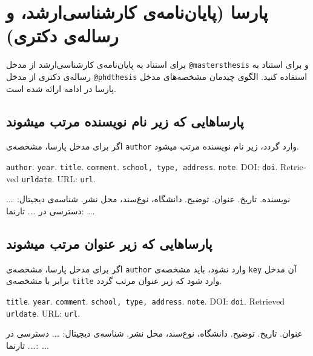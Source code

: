 \documentclass[a4paper,11pt]{article}
\begin{document}
\section{پارسا (پایان‌نامه‌ی کارشناسی‌ارشد، و رساله‌ی دکتری)}
برای استناد به پایان‌نامه‌ی کارشناسی‌ارشد از مدخل \verb|@mastersthesis| و برای استناد به رساله‌ی دکتری از مدخل \verb|@phdthesis| استفاده کنید. الگوی چیدمان مشخصه‌های مدخل پارسا در ادامه ارائه شده است.





\subsection{پارساهایی که زیر نام نویسنده مرتب میشوند}
اگر برای مدخل پارسا، مشخصه‌ی \verb|author| وارد گردد، زیر نام نویسنده مرتب میشود.

\begin{itemize}[nosep]
\begin{latin}
\item[] []
{\tt author}. {\tt year}. {\tt title}. {\tt comment}. {\tt school, type, address}. {\tt note}. DOI: {\tt doi}. Retrieved {\tt urldate}. URL: {\tt url}. 
\end{latin}

\item[] []
{\persianttfamily نویسنده}. {\persianttfamily تاریخ}. {\persianttfamily عنوان}. {\persianttfamily توضیح}. {\persianttfamily دانشگاه، نوع‌سند، محل نشر}. شناسه‌ی دیجیتال: {\persianttfamily …}. دسترسی در {\persianttfamily …}. تارنما: {\persianttfamily …}. 
\end{itemize}





\subsection{پارساهایی که زیر عنوان مرتب میشوند}
اگر برای مدخل پارسا، مشخصه‌ی \verb|author| وارد نشود، باید مشخصه‌ی \verb|key| آن مدخل برابر با مشخصه‌ی \verb|title| وارد شود که زیر عنوان مرتب گردد.

\begin{itemize}[nosep]
\begin{latin}
\item[] []
{\tt title}. {\tt year}. {\tt comment}. {\tt school, type, address}. {\tt note}. DOI: {\tt doi}. Retrieved {\tt urldate}. URL: {\tt url}. 
\end{latin}

\item[] []
{\persianttfamily عنوان}. {\persianttfamily تاریخ}. {\persianttfamily توضیح}. {\persianttfamily دانشگاه، نوع‌سند، محل نشر}. شناسه‌ی دیجیتال: {\persianttfamily …}. دسترسی در {\persianttfamily …}. تارنما: {\persianttfamily …}. 
\end{itemize}
\end{document}

